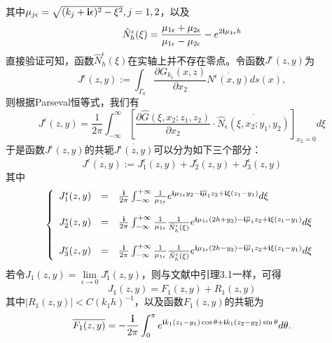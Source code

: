 其中$\mu_{j\epsilon}=\sqrt{(k_j+\mathbf{i}\epsilon)^2-\xi^2},j=1,2$，以及
\begin{equation}
    \hat N_h^{\epsilon}(\xi)=
    \frac{\mu_{1\epsilon}+\mu_{2\epsilon}}{\mu_{1\epsilon}-\mu_{2\epsilon}}-e^{2\mathbf{i}\mu_{1\epsilon}h}
\end{equation}
直接验证可知，函数$\hat N_h^{\epsilon}(\xi)$在实轴上并不存在零点。令函数$J^{\epsilon}(z,y)$为
\begin{equation}
  J^{\epsilon}(z,y):=\int_{\Gamma_0}\frac{\partial G_{k_1}(x,z)}{\partial x_2}\overline {N^{\epsilon}(x,y)}ds(x),
\end{equation}
则根据Parseval恒等式，我们有
\begin{equation}
J^{\epsilon}(z,y)=\frac{1}{2\pi}\int_{-\infty}^{\infty}
   \left[\frac{\partial \hat{G} (\xi,x_2;z_1,z_2)}{\partial x_2}\cdot\overline{\hat{N}_{\epsilon} (\xi,x_2;y_1,y_2)}\right]_{x_2=0}d\xi
\end{equation}
于是函数$J^{\epsilon}(z,y)$的共轭$\overline{J^{\epsilon}(z,y)}$可以分为如下三个部分：
\begin{equation}
  \overline{J^{\epsilon}(z,y)}:=J^{\epsilon}_1(z,y)+J^{\epsilon}_2(z,y)+J^{\epsilon}_3(z,y)
\end{equation}
其中
\begin{eqnarray}
\left\{
\begin{array}{lll}
J^{\epsilon}_1(z,y)&=&\frac{\mathbf{i}}{2\pi}\int_{-\infty}^{+\infty}\frac{1}{\mu_{1\epsilon}}
e^{\mathbf{i}\mu_{1\epsilon}y_2-\mathbf{i}\overline\mu_1z_2+\mathbf{i}\xi(z_1-y_1)}d\xi\\
& &\\
J^{\epsilon}_2(z,y)&=&\frac{\mathbf{i}}{2\pi}\int_{-\infty}^{+\infty}\frac{1}{\mu_{1\epsilon}}
\frac{1}{\hat N_h^{\epsilon}(\xi)}
e^{\mathbf{i}\mu_{1\epsilon}(2h+y_2)-\mathbf{i}\overline\mu_1 z_2+\mathbf{i}\xi(z_1-y_1)}d\xi\\
& &\\
J^{\epsilon}_3(z,y)&=&\frac{\mathbf{i}}{2\pi}\int_{-\infty}^{+\infty}\frac{1}{\mu_{1\epsilon}}
\frac{1}{\hat N_h^{\epsilon}(\xi)}
e^{\mathbf{i}\mu_{1\epsilon}(2h-y_2)-\mathbf{i}\overline\mu_1 z_2+\mathbf{i}\xi(z_1-y_1)}d\xi
\end{array}
\right.
\end{eqnarray}
若令$J_1(z,y)=\lim\limits_{\epsilon\rightarrow0}J^{\epsilon}_1(z,y)$，则与文献\cite{ch_ha}中引理3.1一样，可得
\begin{equation}
  J_1(z,y)=F_1(z,y)+R_1(z,y)
\end{equation}
其中$|R_1(z,y)|< C(k_1h)^{-1}$，以及函数$F_1(z,y)$的共轭为
\begin{equation}
  \overline{F_1(z,y)}=-\frac{\mathbf{i}}{2\pi}\int_0^{\pi}e^{\mathbf{i} k_1(z_1-y_1)\cos\theta+\mathbf{i} k_1(z_2-y_2)\sin\theta}d\theta.
\end{equation}
